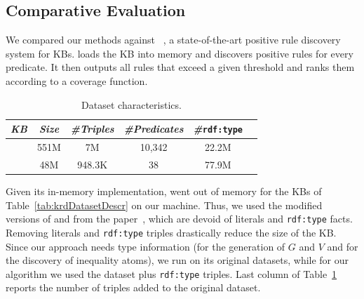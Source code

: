\vspace{-1ex}
\subsection{Comparative Evaluation} \label{sec:krd_comparative}
\vspace{-0.5ex}
We compared our methods against \amie~\cite{galarraga2015fast}, a state-of-the-art positive rule discovery system for KBs.
%
\amie loads the KB into memory and discovers positive rules for every predicate. %
It then outputs all rules that exceed a given threshold and ranks them according to a coverage function.

\begin{table}[t]
	\centering
	\caption{\amie Dataset characteristics.}
			\vspace{-2ex}
	\label{tab:AmieDatasetDescr}
	\begin{small}
		\begin{tabular}{|c|c|c|c|c|c|}
			\hline
			\hline
			{\it KB}&{\it Size}&{\it  \#Triples}&{\it \#Predicates}&{\it \#}\texttt{rdf:type}\tabularnewline
			\hline
			\dbpedia & 551M & 7M & 10,342 & 22.2M \tabularnewline
			\yago 2 & 48M & 948.3K & 38 & 77.9M  \tabularnewline
			\hline
		\end{tabular}
	\end{small}
\end{table}

Given its in-memory implementation, \amie went out of memory for the KBs of Table~\ref{tab:krdDatasetDescr} on our machine. Thus, we used the modified versions of \yago and \dbpedia from the \amie paper~\cite{galarraga2015fast}, which are devoid of literals and \texttt{rdf:type} facts.
%
Removing literals and \texttt{rdf:type} triples drastically reduce the size of the KB. Since our approach needs type information (for the generation of $G$ and $V$ and for the discovery of inequality atoms), we run \amie on its original datasets, while for our algorithm we used the \amie dataset plus \texttt{rdf:type} triples. Last column of Table~\ref{tab:AmieDatasetDescr} reports the number of triples added to the original \amie dataset.

